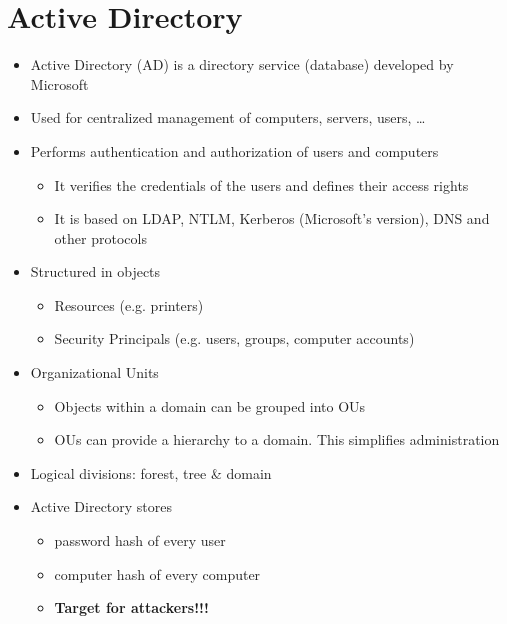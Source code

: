 

\section{Active Directory}
\begin{itemize}
    \item Active Directory (AD) is a directory service (database) developed by Microsoft
    \item Used for centralized management of computers, servers, users, …
    \item Performs authentication and authorization of users and computers
    \begin{itemize}
        \item It verifies the credentials of the users and defines their access rights
        \item It is based on LDAP, NTLM, Kerberos (Microsoft's version), DNS and other protocols
    \end{itemize}
    \item Structured in objects
    \begin{itemize}
        \item Resources (e.g. printers)
        \item Security Principals (e.g. users, groups, computer accounts)
    \end{itemize}
    \item Organizational Units
    \begin{itemize}
        \item Objects within a domain can be grouped into OUs
        \item OUs can provide a hierarchy to a domain. This simplifies administration
    \end{itemize}
    \item Logical divisions: forest, tree \& domain
    \item Active Directory stores
    \begin{itemize}
        \item password hash of every user
        \item computer hash of every computer
        \color{red}
        \item \textbf{Target for attackers!!!}
    \end{itemize}
\end{itemize}

